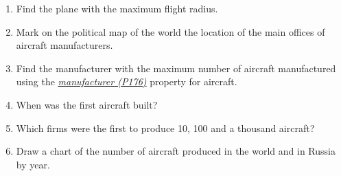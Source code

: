 \begin{enumerate}
\item Find the plane with the maximum flight radius.
\item Mark on the political map of the world the location of the main offices of aircraft manufacturers.
\item Find the manufacturer with the maximum number of aircraft manufactured using the \href{https://w.wiki/vF7}{\textit{manufacturer (P176)}} property for aircraft.
\item When was the first aircraft built?
\item Which firms were the first to produce 10, 100 and a thousand aircraft?
\item Draw a chart of the number of aircraft produced in the world and in Russia by year.
\end{enumerate}
